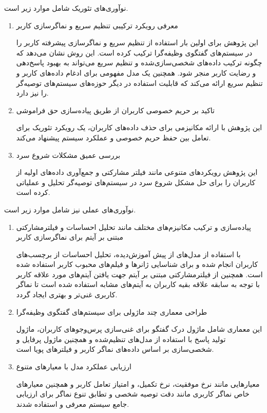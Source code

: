 نوآوری‌های تئوریک شامل موارد زیر است.
\begin{enumerate}
\item
معرفی رویکرد ترکیبی تنظیم سریع و نماگر‌سازی کاربر

این پژوهش برای اولین بار استفاده از تنظیم سریع و نماگر‌سازی پیشرفته کاربر را در سیستم‌های گفتگوی وظیفه‌گرا ترکیب کرده است. این روش نشان می‌دهد که چگونه ترکیب داده‌های شخصی‌سازی‌شده و تنظیم سریع می‌تواند به بهبود پاسخ‌دهی و رضایت کاربر منجر شود. همچنین یک مدل مفهومی برای ادغام داده‌های کاربر و تنظیم سریع ارائه می‌کند که قابلیت استفاده در دیگر حوزه‌های سیستم‌های توصیه‌گر را نیز دارد.
\item
تاکید بر حریم خصوصی کاربران از طریق پیاده‌سازی حق فراموشی

این پژوهش با ارائه مکانیزمی برای حذف داده‌های کاربران، یک رویکرد تئوریک برای تعامل بین حفظ حریم خصوصی و عملکرد سیستم پیشنهاد می‌کند.

\item
بررسی عمیق مشکلات شروع سرد

این پژوهش رویکردهای متنوعی مانند فیلتر مشارکتی و جمع‌آوری داده‌های اولیه از کاربران را برای حل مشکل شروع سرد در سیستم‌های توصیه‌گر تحلیل و عملیاتی کرده است.
\end{enumerate}



نوآوری‌های عملی نیز شامل موارد زیر است.
\begin{enumerate}
\item
پیاده‌سازی و ترکیب مکانیزم‌های مختلف مانند تحلیل احساسات و فیلترمشارکتی مبتنی بر آیتم برای نماگر‌سازی کاربر

با استفاده از مدل‌های از پیش آموزش‌دیده، تحلیل احساسات از برچسب‌های کاربران انجام شده و برای شناسایی ژانرها و فیلم‌های محبوب کاربر استفاده شده است. همچنین از فیلترمشارکتی مبتنی بر آیتم جهت یافتن آیتم‌های مورد علاقه کاربر با توجه به سابقه علاقه بقیه کاربران به آیتم‌های مشابه استفاده شده است تا نماگر کاربری غنی‌تر و بهتری ایجاد گردد.

\item
طراحی معماری چند ماژولی برای سیستم‌های گفتگوی وظیفه‌گرا

این معماری شامل ماژول درک گفتگو برای غنی‌سازی پرس‌وجوهای کاربران، ماژول تولید پاسخ با استفاده از مدل‌های تنظیم‌شده و همچنین ماژول پرفایل و شخصی‌سازی بر اساس داده‌های نماگر کاربر و فیلترهای پویا است.

\item
ارزیابی عملکرد مدل با معیارهای متنوع

معیارهایی مانند نرخ موفقیت، نرخ تکمیل، و امتیاز تعامل کاربر و همچنین معیارهای خاص نماگر کاربری مانند دقت توصیه شخصی و تطابق تنوع نماگر برای ارزیابی جامع سیستم معرفی و استفاده شدند.
\end{enumerate}



